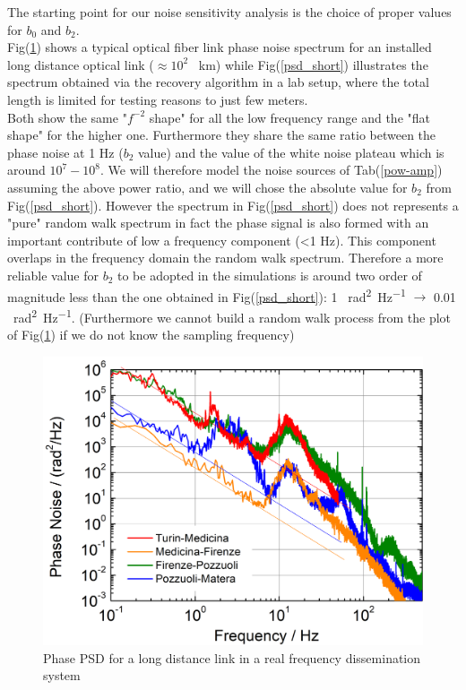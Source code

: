 \documentclass[ fontsize=11pt]{scrartcl} %
\numberwithin{equation}{section} %
\numberwithin{figure}{section} %
\numberwithin{table}{section} %
\begin{document}
The starting point for our noise sensitivity analysis is the choice of proper values for $b_0$ and $b_2$.\\ Fig(\ref{psd_long}) shows a typical optical fiber link phase noise spectrum for an installed long distance optical link  ($\approx 10^2$ \SI{}{\kilo\meter}) while Fig(\ref{psd_short}) illustrates the spectrum obtained via the recovery algorithm in a lab setup, where the total length is limited for testing reasons to just  few meters.\\
Both show the same "$f^{-2}$ shape" for all the low frequency range and the "flat shape" for the higher one.
Furthermore they share the same ratio between the phase noise at 1 Hz ($b_2$ value) and the value of the white noise plateau which is around $10^{7}-10^{8}$.
We will therefore model the noise sources of Tab(\ref{pow-amp}) assuming the above power ratio, and we will chose the absolute value for $b_2$ from Fig(\ref{psd_short}). However the spectrum in Fig(\ref{psd_short}) does not represents a "pure" random walk spectrum in fact the phase signal is also formed with an important contribute of low a frequency component (<1 Hz). This component overlaps in the frequency domain the random walk spectrum. Therefore a more reliable value for $b_2$ to be adopted in the simulations is around two order of magnitude less than the one obtained in Fig(\ref{psd_short}): 1 \SI{}{\radian\squared\per\hertz} $\rightarrow$ 0.01 \SI{}{\radian\squared\per\hertz}. (Furthermore we cannot build a random walk process from the plot of Fig(\ref{psd_long}) if we do not know the sampling frequency)

\begin{figure}[hbtp]
\centering
\includegraphics[scale=0.45]{immagini_noise/noise_long.png}
\caption{Phase PSD for a long distance link in a real frequency dissemination system}
\label{psd_long}
\end{figure}
\end{document}
